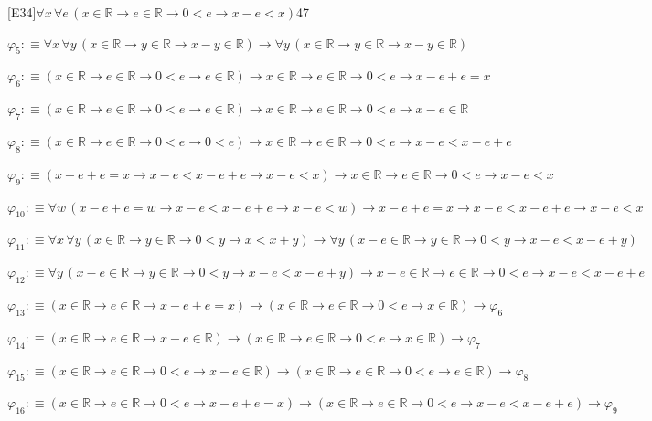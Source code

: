 \begin{fullproof}{[E34]}{$\forall x\,\forall e\,(x \in \mathbb{R} \to e \in \mathbb{R} \to 0 < e \to x - e < x)$}{47}
\begin{abbrevlist}
\item $\varphi_{5} :\equiv \forall x\,\forall y\,(x \in \mathbb{R} \to y \in \mathbb{R} \to x - y \in \mathbb{R}) \to \forall y\,(x \in \mathbb{R} \to y \in \mathbb{R} \to x - y \in \mathbb{R})$
\item $\varphi_{6} :\equiv (x \in \mathbb{R} \to e \in \mathbb{R} \to 0 < e \to e \in \mathbb{R}) \to x \in \mathbb{R} \to e \in \mathbb{R} \to 0 < e \to x - e + e = x$
\item $\varphi_{7} :\equiv (x \in \mathbb{R} \to e \in \mathbb{R} \to 0 < e \to e \in \mathbb{R}) \to x \in \mathbb{R} \to e \in \mathbb{R} \to 0 < e \to x - e \in \mathbb{R}$
\item $\varphi_{8} :\equiv (x \in \mathbb{R} \to e \in \mathbb{R} \to 0 < e \to 0 < e) \to x \in \mathbb{R} \to e \in \mathbb{R} \to 0 < e \to x - e < x - e + e$
\item $\varphi_{9} :\equiv (x - e + e = x \to x - e < x - e + e \to x - e < x) \to x \in \mathbb{R} \to e \in \mathbb{R} \to 0 < e \to x - e < x$
\item $\varphi_{10} :\equiv \forall w\,(x - e + e = w \to x - e < x - e + e \to x - e < w) \to x - e + e = x \to x - e < x - e + e \to x - e < x$
\item $\varphi_{11} :\equiv \forall x\,\forall y\,(x \in \mathbb{R} \to y \in \mathbb{R} \to 0 < y \to x < x + y) \to \forall y\,(x - e \in \mathbb{R} \to y \in \mathbb{R} \to 0 < y \to x - e < x - e + y)$
\item $\varphi_{12} :\equiv \forall y\,(x - e \in \mathbb{R} \to y \in \mathbb{R} \to 0 < y \to x - e < x - e + y) \to x - e \in \mathbb{R} \to e \in \mathbb{R} \to 0 < e \to x - e < x - e + e$
\item $\varphi_{13} :\equiv (x \in \mathbb{R} \to e \in \mathbb{R} \to x - e + e = x) \to (x \in \mathbb{R} \to e \in \mathbb{R} \to 0 < e \to x \in \mathbb{R}) \to \varphi_{6}$
\item $\varphi_{14} :\equiv (x \in \mathbb{R} \to e \in \mathbb{R} \to x - e \in \mathbb{R}) \to (x \in \mathbb{R} \to e \in \mathbb{R} \to 0 < e \to x \in \mathbb{R}) \to \varphi_{7}$
\item $\varphi_{15} :\equiv (x \in \mathbb{R} \to e \in \mathbb{R} \to 0 < e \to x - e \in \mathbb{R}) \to (x \in \mathbb{R} \to e \in \mathbb{R} \to 0 < e \to e \in \mathbb{R}) \to \varphi_{8}$
\item $\varphi_{16} :\equiv (x \in \mathbb{R} \to e \in \mathbb{R} \to 0 < e \to x - e + e = x) \to (x \in \mathbb{R} \to e \in \mathbb{R} \to 0 < e \to x - e < x - e + e) \to \varphi_{9}$
\end{abbrevlist}
\end{fullproof}
